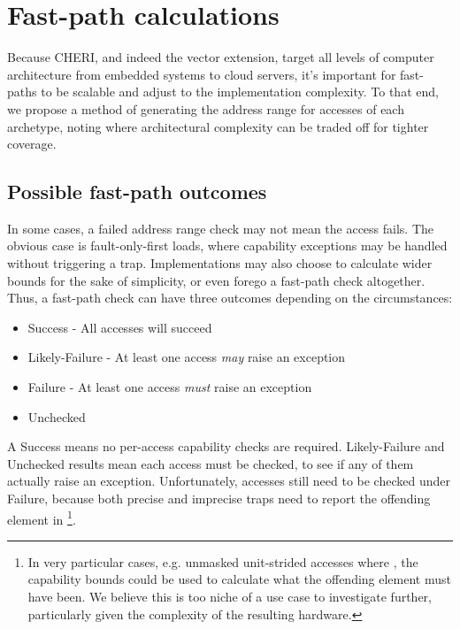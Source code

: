\section{Fast-path calculations}
Because CHERI, and indeed the vector extension, target all levels of computer architecture from embedded systems to cloud servers, it's important for fast-paths to be scalable and adjust to the implementation complexity.
To that end, we propose a method of generating the address range for accesses of each archetype, noting where architectural complexity can be traded off for tighter coverage.


\subsection{Possible fast-path outcomes}
In some cases, a failed address range check may not mean the access fails.
The obvious case is fault-only-first loads, where capability exceptions may be handled without triggering a trap.
Implementations may also choose to calculate wider bounds for the sake of simplicity, or even forego a fast-path check altogether.
Thus, a fast-path check can have three outcomes depending on the circumstances:
\begin{itemize}
    \item Success - All accesses will succeed
    \item Likely-Failure - At least one access \emph{may} raise an exception
    \item Failure - At least one access \emph{must} raise an exception
    \item Unchecked
\end{itemize}


A Success means no per-access capability checks are required.
Likely-Failure and Unchecked results mean each access must be checked, to see if any of them actually raise an exception.
Unfortunately, accesses still need to be checked under Failure, because both precise and imprecise traps need to report the offending element in \footnote{In very particular cases, e.g. unmasked unit-strided accesses where , the capability bounds could be used to calculate what the offending element must have been. We believe this is too niche of a use case to investigate further, particularly given the complexity of the resulting hardware.}.

